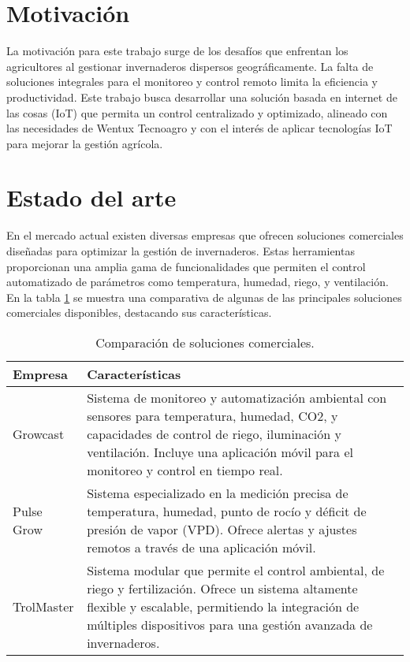 
\section{Motivación}

La motivación para este trabajo surge de los desafíos que enfrentan los agricultores al gestionar invernaderos dispersos geográficamente. La falta de soluciones integrales para el monitoreo y control remoto limita la eficiencia y productividad. Este trabajo busca desarrollar una solución basada en internet de las cosas (IoT) que permita un control centralizado y optimizado, alineado con las necesidades de Wentux Tecnoagro y con el interés de aplicar tecnologías IoT para mejorar la gestión agrícola.


\section{Estado del arte}
En el mercado actual existen diversas empresas que ofrecen soluciones comerciales diseñadas para optimizar la gestión de invernaderos. Estas herramientas proporcionan una amplia gama de funcionalidades que permiten el control automatizado de parámetros como temperatura, humedad, riego, y ventilación. En la tabla \ref{tabla:empresas_invernaderos} se muestra una comparativa de algunas de las principales soluciones comerciales disponibles, destacando sus características.

\begin{table}[h]
	\centering
	\caption[Comparación de soluciones comerciales]{Comparación de soluciones comerciales.}
	\begin{tabular}{l p{10cm}}    
		\toprule
		\textbf{Empresa} 	 & \textbf{Características}  \\
		\midrule
		Growcast & Sistema de monitoreo y automatización ambiental con sensores para temperatura, humedad, CO2, y capacidades de control de riego, iluminación y ventilación. Incluye una aplicación móvil para el monitoreo y control en tiempo real. \\		
		Pulse Grow	 & Sistema especializado en la medición precisa de temperatura, humedad, punto de rocío y déficit de presión de vapor (VPD). Ofrece alertas y ajustes remotos a través de una aplicación móvil. \\
		TrolMaster	 & Sistema modular que permite el control ambiental, de riego y fertilización. Ofrece un sistema altamente flexible y escalable, permitiendo la integración de múltiples dispositivos para una gestión avanzada de invernaderos. \\
		\bottomrule
	\end{tabular}
	\label{tabla:empresas_invernaderos}
\end{table}


